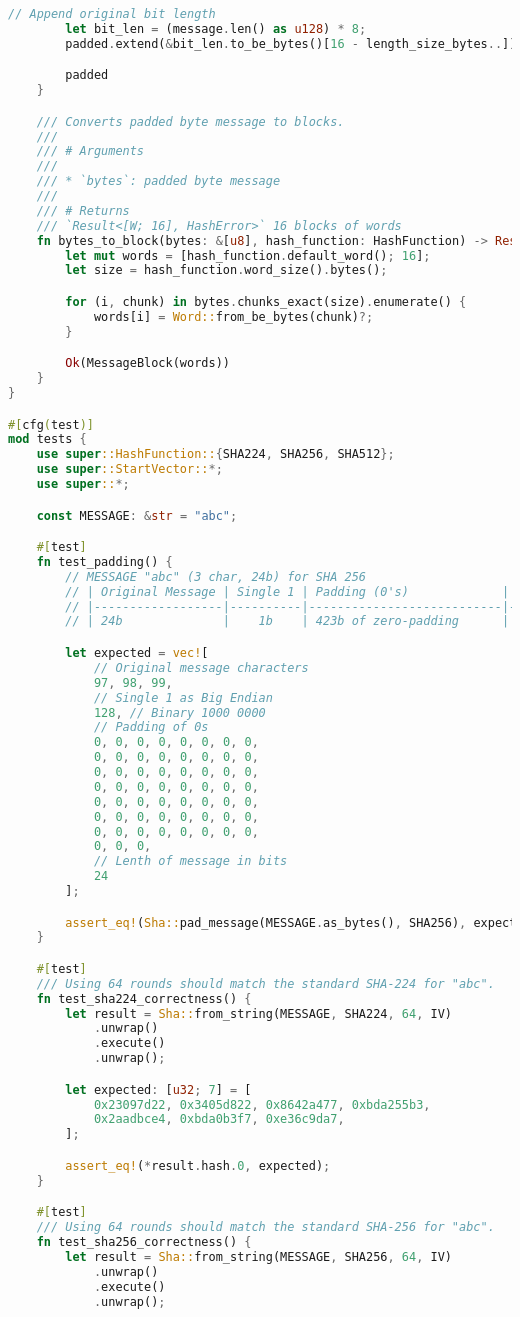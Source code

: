 \begin{lstlisting}[language=rust, caption={sha/sha.rs}]
		// Append original bit length
		let bit_len = (message.len() as u128) * 8;
		padded.extend(&bit_len.to_be_bytes()[16 - length_size_bytes..]);

		padded
	}

	/// Converts padded byte message to blocks.
	///
	/// # Arguments
	///
	/// * `bytes`: padded byte message
	///
	/// # Returns
	/// `Result<[W; 16], HashError>` 16 blocks of words
	fn bytes_to_block(bytes: &[u8], hash_function: HashFunction) -> Result<MessageBlock, HashError> {
		let mut words = [hash_function.default_word(); 16];
		let size = hash_function.word_size().bytes();

		for (i, chunk) in bytes.chunks_exact(size).enumerate() {
			words[i] = Word::from_be_bytes(chunk)?;
		}

		Ok(MessageBlock(words))
	}
}

#[cfg(test)]
mod tests {
	use super::HashFunction::{SHA224, SHA256, SHA512};
	use super::StartVector::*;
	use super::*;

	const MESSAGE: &str = "abc";

	#[test]
	fn test_padding() {
		// MESSAGE "abc" (3 char, 24b) for SHA 256
		// | Original Message | Single 1 | Padding (0's)             | Length (64b)          |
		// |------------------|----------|---------------------------|-----------------------|
		// | 24b              |    1b    | 423b of zero-padding      | 64b representing "24" |

		let expected = vec![
			// Original message characters
			97, 98, 99,
			// Single 1 as Big Endian
			128, // Binary 1000 0000
			// Padding of 0s
			0, 0, 0, 0, 0, 0, 0, 0,
			0, 0, 0, 0, 0, 0, 0, 0,
			0, 0, 0, 0, 0, 0, 0, 0,
			0, 0, 0, 0, 0, 0, 0, 0,
			0, 0, 0, 0, 0, 0, 0, 0,
			0, 0, 0, 0, 0, 0, 0, 0,
			0, 0, 0, 0, 0, 0, 0, 0,
			0, 0, 0,
			// Lenth of message in bits
			24
		];

		assert_eq!(Sha::pad_message(MESSAGE.as_bytes(), SHA256), expected);
	}

	#[test]
	/// Using 64 rounds should match the standard SHA-224 for "abc".
	fn test_sha224_correctness() {
		let result = Sha::from_string(MESSAGE, SHA224, 64, IV)
			.unwrap()
			.execute()
			.unwrap();

		let expected: [u32; 7] = [
			0x23097d22, 0x3405d822, 0x8642a477, 0xbda255b3,
			0x2aadbce4, 0xbda0b3f7, 0xe36c9da7,
		];

		assert_eq!(*result.hash.0, expected);
	}

	#[test]
	/// Using 64 rounds should match the standard SHA-256 for "abc".
	fn test_sha256_correctness() {
		let result = Sha::from_string(MESSAGE, SHA256, 64, IV)
			.unwrap()
			.execute()
			.unwrap();


\end{lstlisting}
